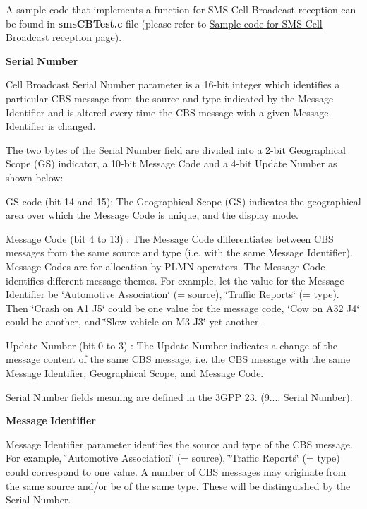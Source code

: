 A sample code that implements a function for S\+MS Cell Broadcast reception can be found in {\bfseries sms\+C\+B\+Test.\+c} file (please refer to \hyperlink{c_smsCbSample}{Sample code for S\+MS Cell Broadcast reception} page).

{\bfseries Serial} {\bfseries Number} 

Cell Broadcast Serial Number parameter is a 16-\/bit integer which identifies a particular C\+BS message from the source and type indicated by the Message Identifier and is altered every time the C\+BS message with a given Message Identifier is changed.

The two bytes of the Serial Number field are divided into a 2-\/bit Geographical Scope (GS) indicator, a 10-\/bit Message Code and a 4-\/bit Update Number as shown below\+:


\begin{DoxyItemize}
\item GS code (bit 14 and 15)\+: The Geographical Scope (GS) indicates the geographical area over which the Message Code is unique, and the display mode.
\item Message Code (bit 4 to 13) \+: The Message Code differentiates between C\+BS messages from the same source and type (i.\+e. with the same Message Identifier). Message Codes are for allocation by P\+L\+MN operators. The Message Code identifies different message themes. For example, let the value for the Message Identifier be \char`\"{}\+Automotive Association\char`\"{} (= source), \char`\"{}\+Traffic Reports\char`\"{} (= type). Then \char`\"{}\+Crash on A1 J5\char`\"{} could be one value for the message code, \char`\"{}\+Cow on A32 J4\char`\"{} could be another, and \char`\"{}\+Slow vehicle on M3 J3\char`\"{} yet another.
\item Update Number (bit 0 to 3) \+: The Update Number indicates a change of the message content of the same C\+BS message, i.\+e. the C\+BS message with the same Message Identifier, Geographical Scope, and Message Code.
\end{DoxyItemize}

Serial Number fields meaning are defined in the 3\+G\+PP 23. (9.... Serial Number).

{\bfseries Message} {\bfseries Identifier} 

Message Identifier parameter identifies the source and type of the C\+BS message. For example, \char`\"{}\+Automotive Association\char`\"{} (= source), \char`\"{}\+Traffic Reports\char`\"{} (= type) could correspond to one value. A number of C\+BS messages may originate from the same source and/or be of the same type. These will be distinguished by the Serial Number.

